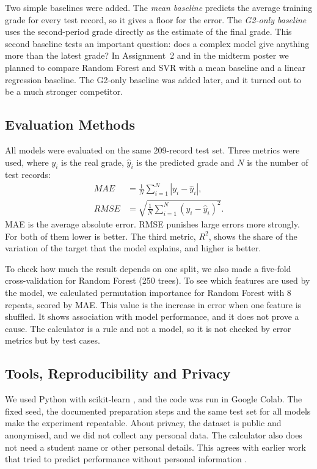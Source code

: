 \documentclass[10pt,twocolumn,a4paper]{article}
\begin{document}
Two simple baselines were added. The \emph{mean baseline} predicts the average training grade for every test record, so it gives a floor for the error. The \emph{G2-only baseline} uses the second-period grade directly as the estimate of the final grade. This second baseline tests an important question: does a complex model give anything more than the latest grade? In Assignment~2 and in the midterm poster we planned to compare Random Forest and SVR with a mean baseline and a linear regression baseline. The G2-only baseline was added later, and it turned out to be a much stronger competitor.

\subsection{Evaluation Methods}
All models were evaluated on the same 209-record test set. Three metrics were used, where $y_i$ is the real grade, $\hat{y}_i$ is the predicted grade and $N$ is the number of test records:
\begin{align}
MAE &= \frac{1}{N}\sum_{i=1}^{N}\left|y_i-\hat{y}_i\right|,\\
RMSE &= \sqrt{\frac{1}{N}\sum_{i=1}^{N}\left(y_i-\hat{y}_i\right)^2}.
\end{align}
MAE is the average absolute error. RMSE punishes large errors more strongly. For both of them lower is better. The third metric, $R^2$, shows the share of the variation of the target that the model explains, and higher is better.

To check how much the result depends on one split, we also made a five-fold cross-validation for Random Forest (250 trees). To see which features are used by the model, we calculated permutation importance for Random Forest with 8 repeats, scored by MAE. This value is the increase in error when one feature is shuffled. It shows association with model performance, and it does not prove a cause. The calculator is a rule and not a model, so it is not checked by error metrics but by test cases.

\subsection{Tools, Reproducibility and Privacy}
We used Python with scikit-learn \cite{pedregosa2011}, and the code was run in Google Colab. The fixed seed, the documented preparation steps and the same test set for all models make the experiment repeatable. About privacy, the dataset is public and anonymised, and we did not collect any personal data. The calculator also does not need a student name or other personal details. This agrees with earlier work that tried to predict performance without personal information \cite{chavez2023}.
\end{document}

